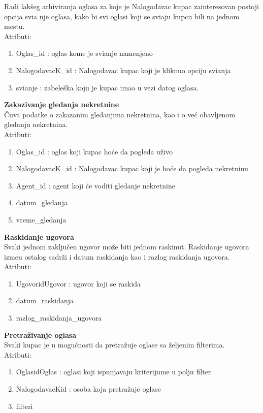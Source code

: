 \documentclass[20pt]{article}
\begin{document}
Radi lak\v {s}eg arhiviranja oglasa za koje je Nalogodavac kupac zainteresovan postoji opcija svi\dj a nje oglasa, kako bi svi oglasi koji se svi\dj aju kupcu bili na jednom mestu.\\
\indent Atributi:
\begin{enumerate}
        \item  Oglas\_id : oglas kome je svi\dj anje namenjeno
        \item  NalogodavacK\_id : Nalogodavac kupac koji je kliknuo opciju svi\dj anja
        \item  svi\dj anje : zabele\v {s}ka koju je kupac imao u vezi datog oglasa.
\end{enumerate}
{\bfseries Zakazivanje gledanja nekretnine}\\
\v {C}uva podatke o zakazanim gledanjima nekretnina, kao i o ve\' c obavljenom gledanju nekretnina.\\
\indent Atributi:
\begin{enumerate}
        \item  Oglas\_id : oglas koji kupac ho\' ce da pogleda u\v {z}ivo
        \item  NalogodavacK\_id : Nalogodavac kupac koji je ho\' ce da pogleda nekretninu
        \item  Agent\_id : agent koji \' ce voditi gledanje nekretnine
        \item datum\_gledanja
        \item vreme\_gledanja
\end{enumerate}
{\bfseries Raskidanje ugovora}\\
Svaki jednom zaklju\v {c}en ugovor mo\v {z}e biti jednom raskinut. Raskidanje ugovora izme\dj u ostalog sadr\v {z}i i datum raskidanja kao i razlog raskidanja ugovora.\\
\indent Atributi:
\begin{enumerate}
        \item  UgovoridUgovor : ugovor koji se raskida
        \item  datum\_raskidanja
        \item  razlog\_raskidanja\_ugovora
\end{enumerate}
{\bfseries Pretra\v {z}ivanje oglasa}\\
Svaki kupac je u mogu\' cnosti da pretra\v {z}uje oglase sa \v {z}eljenim filterima.\\
\indent Atributi:
\begin{enumerate}
        \item  OglasidOglas : oglasi koji ispunjavaju kriterijume u polju filter
        \item  NalogodavacKid : osoba koja pretra\v {z}uje oglase
        \item  filteri
\end{enumerate}
\end{document}
